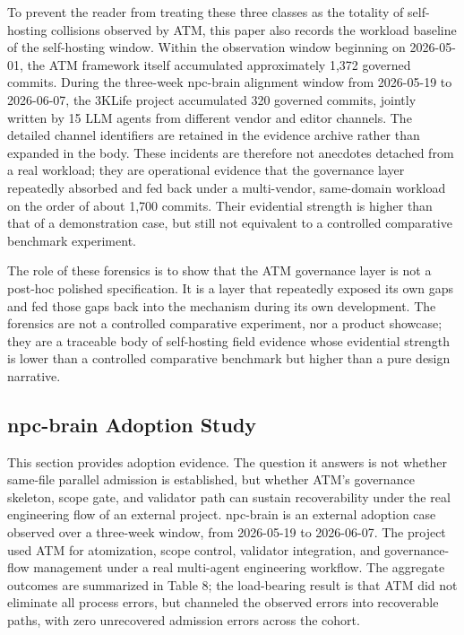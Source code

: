 \documentclass[9pt,letterpaper]{extarticle}
\begin{document}
To prevent the reader from treating these three classes as the totality of self-hosting collisions observed by ATM, this paper also records the workload baseline of the self-hosting window. Within the observation window beginning on 2026-05-01, the ATM framework itself accumulated approximately 1,372 governed commits. During the three-week npc-brain alignment window from 2026-05-19 to 2026-06-07, the 3KLife project accumulated 320 governed commits, jointly written by 15 LLM agents from different vendor and editor channels. The detailed channel identifiers are retained in the evidence archive rather than expanded in the body. These incidents are therefore not anecdotes detached from a real workload; they are operational evidence that the governance layer repeatedly absorbed and fed back under a multi-vendor, same-domain workload on the order of about 1,700 commits. Their evidential strength is higher than that of a demonstration case, but still not equivalent to a controlled comparative benchmark experiment.

The role of these forensics is to show that the ATM governance layer is not a post-hoc polished specification. It is a layer that repeatedly exposed its own gaps and fed those gaps back into the mechanism during its own development. The forensics are not a controlled comparative experiment, nor a product showcase; they are a traceable body of self-hosting field evidence whose evidential strength is lower than a controlled comparative benchmark but higher than a pure design narrative.

\subsection{npc-brain Adoption Study}

This section provides adoption evidence. The question it answers is not whether same-file parallel admission is established, but whether ATM's governance skeleton, scope gate, and validator path can sustain recoverability under the real engineering flow of an external project. npc-brain is an external adoption case observed over a three-week window, from 2026-05-19 to 2026-06-07. The project used ATM for atomization, scope control, validator integration, and governance-flow management under a real multi-agent engineering workflow. The aggregate outcomes are summarized in Table 8; the load-bearing result is that ATM did not eliminate all process errors, but channeled the observed errors into recoverable paths, with zero unrecovered admission errors across the cohort.
\end{document}
